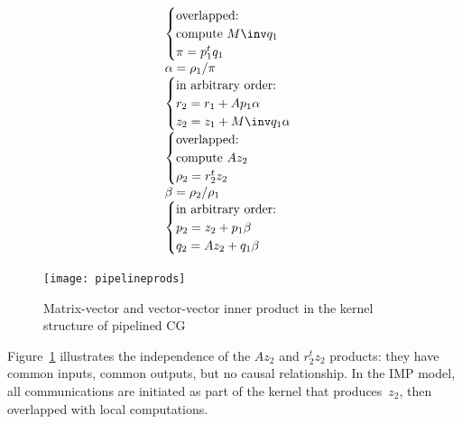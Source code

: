 \documentclass[11pt,fleqn,preprint]{impreport}
\begin{document}
\[
\begin{array}{l}
  \begin{cases}
    \hbox{overlapped:}\\
    \hbox{compute $M\inv q_1$} \\ \pi = p_1^tq_1\\ 
  \end{cases}\\  
  \alpha = \rho_1 /\pi \\
  \begin{cases}
    \hbox{in arbitrary order:}\\    
    r_2 = r_1 + Ap_1\alpha\\
    z_2 = z_1 + M\inv q_1\alpha\\  
  \end{cases}\\
  \begin{cases}
    \hbox{overlapped:}\\
    \hbox{compute $Az_2$} \\ \rho_2 = r_2^tz_2\\
  \end{cases}\\  
  \beta=\rho_2/\rho_1 \\
  \begin{cases}
    \hbox{in arbitrary order:}\\    
    p_2 = z_2 + p_1\beta\\
    q_2 = Az_2 + q_1\beta\\
  \end{cases}\\  
\end{array}
\]

\begin{figure}[ht]
  \texttt{[image: pipelineprods]}
  \caption{Matrix-vector and vector-vector inner product in the kernel
    structure of pipelined CG}
  \label{fig:pipelineprods}
\end{figure}

Figure~\ref{fig:pipelineprods} illustrates the independence of the
$Az_2$ and $r_2^tz_2$ products: they have common inputs, common
outputs, but no causal relationship. In the IMP model, all
communications are initiated as part of the kernel that
produces~$z_2$, then overlapped with local computations.



\end{document}
